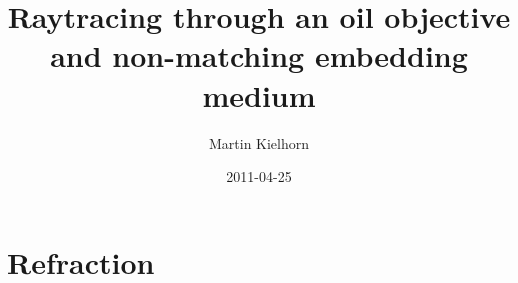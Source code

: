 \documentclass[twocolumn,DIV19]{scrartcl}
\title{Raytracing through an oil objective and non-matching embedding
  medium}
\author{Martin Kielhorn}
\date{2011-04-25}
\begin{document}
\maketitle

\setcounter{tocdepth}{3}
\tableofcontents
\vspace*{1cm}

\newcommand{\vect}[1]{\mathbf{#1}}
\renewcommand{\r}{\vect r}
\renewcommand{\a}{\vect a}
\newcommand{\s}{\vect s}
\def\k{\vect k}
\def\d{\vect d}
\def\e{\vect e}
\def\f{\vect f}
\def\c{\vect c}
\def\x{\vect x}
\def\y{\vect y}
\def\z{\vect z}
\def\q{\vect q}
\def\p{\vect p}
\def\l{\vect l}

\newcommand{\nvect}[1]{\vect{\hat{#1}}}
\renewcommand{\i}{\nvect i}
\def\hc{\nvect c}
\def\hs{\nvect s}
\def\hd{\nvect d}
\def\hx{\nvect x}
\def\hy{\nvect y}

\def\hz{\nvect z}
\def\n{\nvect n}
\def\t{\nvect t}
\def\m{\nvect m}
\def\vrho{\boldsymbol\rho}
\def\abs#1{\mathopen| #1 \mathclose|}

\newcommand{\bild}[1]{\texttt{[image: \#1]}}
\newpage
\section{Refraction}
\end{document}
